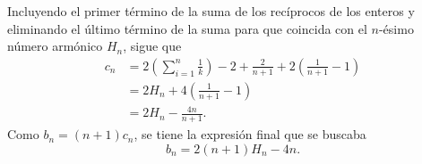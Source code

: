 \begin{solucion}
\begin{equation*}
    \end{equation*}
    Incluyendo el primer término de la suma de los recíprocos de los enteros y eliminando el último término de la suma para que coincida con el $n$-ésimo número armónico $H_n$, sigue que
    \begin{align*}
        c_n&=2\left(\sum_{i=1}^{n}\frac{1}{k}\right)-2+\frac{2}{n+1}+2\left(\frac{1}{n+1}-1\right)\\
        &=2H_n+4\left(\frac{1}{n+1}-1\right)\\
        &=2H_n-\frac{4n}{n+1}.
    \end{align*}
    Como $b_n=(n+1)c_n$, se tiene la expresión final que se buscaba
    \begin{equation*}
        b_n=2(n+1)H_n-4n.
    \end{equation*}
\end{solucion}